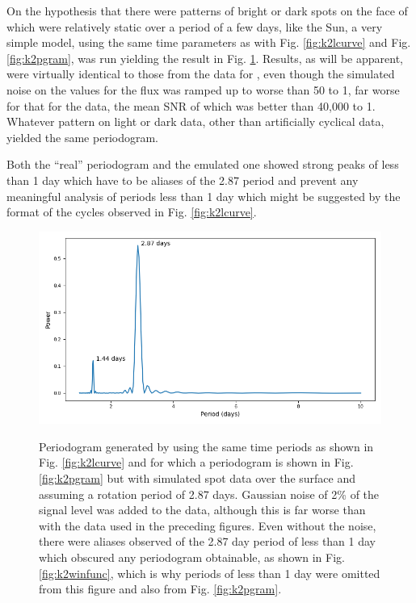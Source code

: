 On the hypothesis that there were patterns of bright or dark spots on the face
of {\ross} which were relatively static over a period of a few days, like the
Sun, a very simple model, using the same time parameters as with Fig.
\ref{fig:k2lcurve} and Fig. \ref{fig:k2pgram}, was run yielding the result in
Fig. \ref{fig:k2emulated}. Results, as will be apparent, were virtually
identical to those from the {\ktwo} data for \ross, even though the simulated
noise on the values for the flux was ramped up to worse than 50 to 1, far worse for
that for the {\ktwo} data, the mean SNR of which was better than 40,000 to 1.
Whatever pattern on light or dark data, other than artificially cyclical data,
yielded the same periodogram.

Both the ``real'' periodogram and the emulated one showed strong peaks of less
than 1 day which have to be aliases of the 2.87 period and prevent any
meaningful analysis of periods less than 1 day which might be suggested by the
format of the cycles observed in Fig. \ref{fig:k2lcurve}.

\begin{figure}[!htbp]
\begin{center}
\includegraphics[scale=0.40]{k2/images/k2emulated.png} \\
\vspace{-.5cm}
\end{center}   
\caption{Periodogram generated by using the same time periods as shown in Fig. \ref{fig:k2lcurve} and
for which a periodogram is shown in Fig.
\ref{fig:k2pgram} but with simulated spot data over the surface and assuming a
rotation period of 2.87 days. Gaussian noise of 2\% of the signal level was
added to the data, although this is far worse
than with the {\ktwo} data used in the preceding
figures. Even without the noise, there were
aliases observed of the 2.87 day period of less
than 1 day which obscured any periodogram
obtainable, as shown in Fig. \ref{fig:k2winfunc}, which is why periods of less
than 1 day were omitted from this figure and also from
Fig. \ref{fig:k2pgram}.}\protect\label{fig:k2emulated}
\end{figure}

